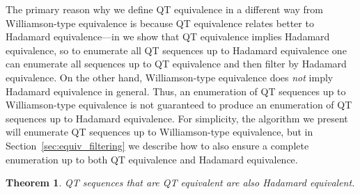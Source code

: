 \documentclass[12pt]{article}
\numberwithin{equation}{section}
\newtheorem{theorem}{Theorem}
\begin{document}
The primary reason why we define QT equivalence
in a different way from Williamson-type equivalence is because QT equivalence
relates better to Hadamard equivalence---in 
we show that QT equivalence implies Hadamard equivalence, so to enumerate
all QT sequences up to Hadamard equivalence one can enumerate all sequences
up to QT equivalence and then filter by Hadamard equivalence.  On the other
hand, Williamson-type equivalence does \emph{not} imply Hadamard equivalence
in general.
Thus, an enumeration of QT sequences
up to Williamson-type equivalence is not guaranteed to produce an enumeration
of QT sequences up to Hadamard equivalence.
For simplicity, the algorithm we present will enumerate QT sequences up to
Williamson-type equivalence, but
in Section~\ref{sec:equiv_filtering}
we describe how to also ensure a complete
enumeration up to both QT equivalence and Hadamard equivalence.

\begin{theorem}\label{thm:equivalence}
QT sequences that are QT equivalent are also Hadamard equivalent.
\end{theorem}
\end{document}
